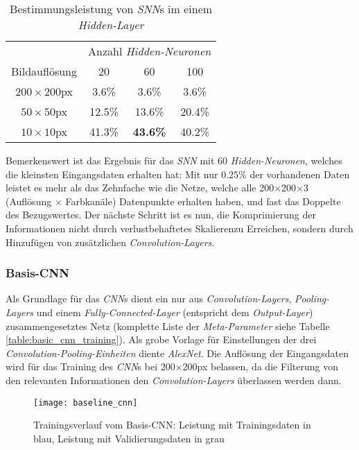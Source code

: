\begin{table}[h]
	\begin{center}
		\def\arraystretch{1.4}
		\begin{tabular}{c | c | c | c }
			& \multicolumn{3}{l}{Anzahl \textit{Hidden-Neuronen}} \\
			Bildauflösung & 20 & 60 & 100\\
			\hline
			$200\times200$px& 3.6\%& 3.6\% & 3.6\%\\
			$50\times50$px& 12.5\% & 13.6\% & 20.4\%\\
			$10\times10$px& 41.3\% & \textbf{43.6\%} & 40.2\%\\
		\end{tabular}
	\end{center}
\caption[Bestimmungsleistung von \textit{SNN}s]{Bestimmungsleistung von \textit{SNN}s im einem \textit{Hidden-Layer}}
\label{table:snn}
\end{table}

Bemerkenswert ist das Ergebnis für das \textit{SNN} mit 60 \textit{Hidden-Neuronen}, welches die kleinsten Eingangsdaten erhalten hat: Mit nur 0.25\% der vorhandenen Daten leistet es mehr als das Zehnfache wie die Netze, welche alle 200$\times$200$\times$3 (Auflösung $\times$ Farbkanäle) Datenpunkte erhalten haben, und fast das Doppelte des Bezugswertes. Der nächste Schritt ist es nun, die Komprimierung der Informationen nicht durch verlustbehaftetes Skalieren\footnotemark[\value{footnote}] zu Erreichen, sondern durch Hinzufügen von zusätzlichen \textit{Convolution-Layers}.

\subsubsection{Basis-CNN}
Als Grundlage für das \textit{CNN}s dient ein nur aus \textit{Convolution-Layers}, \textit{Pooling-Layers} und einem \textit{Fully-Connected-Layer} (entspricht dem \textit{Output-Layer}) zusammengesetztes Netz (komplette Liste der \textit{Meta-Parameter} siehe Tabelle \ref{table:basic_cnn_training}). Als grobe Vorlage für Einstellungen der drei \textit{Convolution-Pooling-Einheiten} diente \textit{AlexNet}\cite{alexnet}. Die Auflösung der Eingangsdaten wird für das Training des \textit{CNN}s bei 200$\times$200px belassen, da die Filterung von den relevanten Informationen den \textit{Convolution-Layers} überlassen werden dann.

\begin{figure}[h]
	\centering
	\texttt{[image: baseline\_cnn]}
	\caption[Trainingsverlauf Basis-\textit{CNN}]{Trainingsverlauf vom Basis-{CNN}: Leistung mit Trainingsdaten in blau, Leistung mit Validierungsdaten in grau}
	\label{img:baseline_cnn}
\end{figure}


